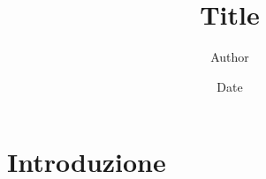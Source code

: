 \documentclass{article}
\title{Title}
\author{Author}
\date{Date}
\begin{document}
\maketitle

\tableofcontents
\section{Introduzione}
\end{document}
